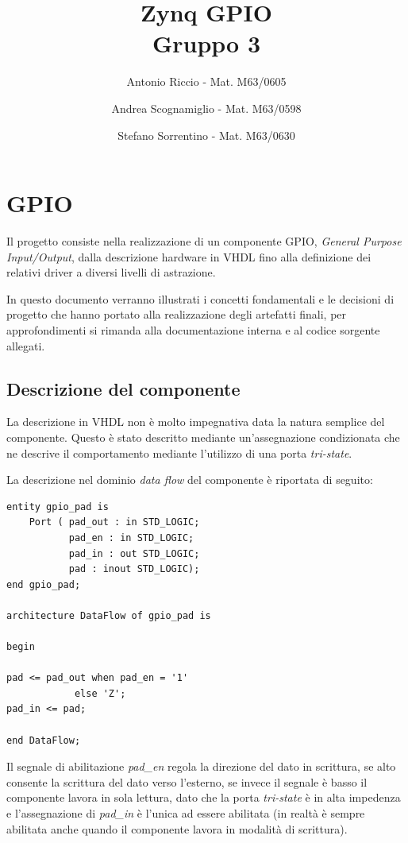 \documentclass[12pt,a4paper,twoside,openany]{book}
\author{Antonio Riccio - Mat. M63/0605
\and Andrea Scognamiglio - Mat. M63/0598
\and Stefano Sorrentino - Mat. M63/0630}
\title{Zynq GPIO \\ Gruppo 3}
\begin{document}
\frontmatter
\maketitle
\setcounter{page}{1}
\mainmatter
\chapter*{GPIO}
Il progetto consiste  nella realizzazione di un componente GPIO, \textit{General Purpose Input/Output},  dalla descrizione hardware in VHDL fino alla definizione dei relativi driver a diversi livelli di astrazione.

In questo documento verranno illustrati i concetti fondamentali e le decisioni di progetto che hanno portato alla realizzazione degli artefatti finali, per approfondimenti si rimanda alla documentazione interna e al codice sorgente allegati. 

\section*{Descrizione del componente}
La descrizione in VHDL non è molto impegnativa data la natura semplice del componente. Questo è stato descritto mediante un'assegnazione condizionata che ne descrive il comportamento mediante l'utilizzo di una porta \textit{tri-state}. 

La descrizione nel dominio \textit{data flow} del componente  è riportata di seguito:
\begin{lstlisting}[caption={componente GPIO}, label={}, captionpos=b]
entity gpio_pad is
    Port ( pad_out : in STD_LOGIC; 
           pad_en : in STD_LOGIC;  
           pad_in : out STD_LOGIC; 
           pad : inout STD_LOGIC); 
end gpio_pad;

architecture DataFlow of gpio_pad is

begin

pad <= pad_out when pad_en = '1'
       		else 'Z';
pad_in <= pad;

end DataFlow;
\end{lstlisting}

Il segnale di abilitazione \textit{pad\_en} regola la direzione del dato in scrittura, se alto consente la scrittura del dato verso l'esterno, se invece il segnale è basso il componente lavora in sola lettura, dato che la porta \textit{tri-state} è in alta impedenza e l'assegnazione di \textit{pad\_in} è l'unica ad essere abilitata (in realtà è sempre abilitata anche quando il componente lavora in modalità di scrittura).
\end{document}
